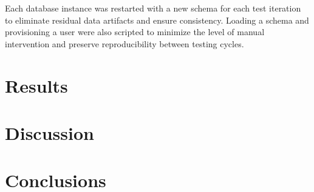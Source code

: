 Each database instance was restarted with a new schema for each test iteration to eliminate residual data artifacts and ensure consistency. Loading a schema and provisioning a user were also scripted to minimize the level of manual intervention and preserve reproducibility between testing cycles.

\section{Results}
\label{sec:results}

\section{Discussion}
\label{sec:discussion}

\section{Conclusions}
\label{sec:conclusions}
